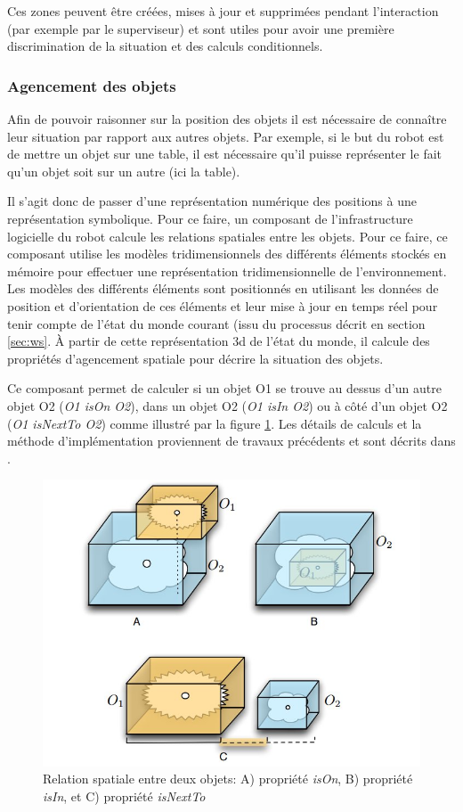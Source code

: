 \documentclass[a4paper,11pt,twoside]{StyleThese}
\begin{document}
Ces zones peuvent être créées, mises à jour et supprimées pendant l'interaction (par exemple par le superviseur) et sont utiles pour avoir une première discrimination de la situation et des calculs conditionnels.


\subsubsection{Agencement des objets}
\label{sec:agencement}
Afin de pouvoir raisonner sur la position des objets il est nécessaire de connaître leur situation par rapport aux autres objets. Par exemple, si le but du robot est de mettre un objet sur une table, il est nécessaire qu'il puisse représenter le fait qu'un objet soit sur un autre (ici la table).

Il s'agit donc de passer d'une représentation numérique des positions à une représentation symbolique. Pour ce faire, un composant de l'infrastructure logicielle du robot calcule les relations spatiales entre les objets. Pour ce faire, ce composant utilise les modèles tridimensionnels des différents éléments stockés en mémoire pour effectuer une représentation tridimensionnelle de l'environnement. Les modèles des différents éléments sont positionnés en utilisant les données de position et d'orientation de ces éléments et leur mise à jour en temps réel pour tenir compte de l'état du monde courant (issu du processus décrit en section \ref{sec:ws}. À partir de cette représentation 3d de l'état du monde, il calcule des propriétés d'agencement spatiale pour décrire la situation des objets.

Ce composant permet de calculer si un objet O1 se trouve au dessus d'un autre objet O2 (\textit{O1 isOn O2}), dans un objet O2 (\textit{O1 isIn O2}) ou à côté d'un objet O2 (\textit{O1 isNextTo O2}) comme illustré par la figure \ref{fig:spar}. Les détails de calculs et la méthode d'implémentation proviennent de travaux précédents et sont décrits dans \cite{sisbot2011situation}.


\begin{figure}[ht!]
 \centering
  \includegraphics[width=0.5\linewidth]{./img/spar.jpg} 
  \caption {Relation spatiale entre deux objets: A) propriété \textit{isOn}, B) propriété \textit{isIn}, et C) propriété \textit{isNextTo}}
  \label{fig:spar}
\end{figure}
\end{document}
